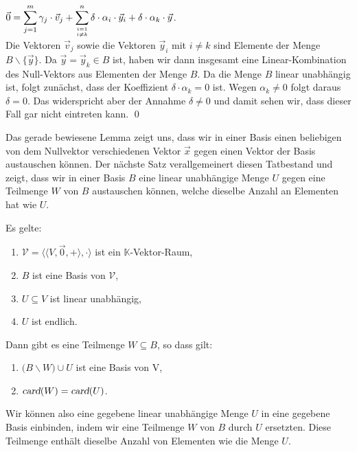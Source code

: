 \begin{enumerate}
\begin{enumerate}
            $\displaystyle\vec{0} = \sum\limits_{j=1}^m \gamma_j \cdot \vec{v}_j + \sum\limits_{i=1 \atop i \not= k}^n \delta\cdot \alpha_i \cdot \vec{y}_i + \delta\cdot \alpha_k \cdot \vec{y}$.
            \\[0.2cm]
            Die Vektoren $\vec{v}_j$ sowie die Vektoren $\vec{y}_i$ mit $i \not= k$ sind Elemente der Menge
            $B \backslash \{ \vec{y} \}$.  Da $\vec{y} = \vec{y}_k \in B$ ist,  haben wir dann insgesamt eine Linear-Kombination des Null-Vektors aus
            Elementen der Menge $B$.  Da die Menge $B$ linear unabh\"{a}ngig ist, folgt zun\"{a}chst, dass der Koeffizient
            $\delta\cdot \alpha_k = 0$  ist.  Wegen $\alpha_k \not= 0$ folgt daraus $\delta = 0$.  Das widerspricht aber der Annahme $\delta \not= 0$
            und damit sehen wir, dass dieser Fall gar nicht eintreten kann.
            \qed
      \end{enumerate}
\end{enumerate}

Das gerade bewiesene Lemma zeigt uns, dass wir in einer Basis einen beliebigen von dem Nullvektor
verschiedenen Vektor $\vec{x}$ 
gegen einen Vektor der Basis austauschen k\"{o}nnen.  Der n\"{a}chste Satz verallgemeinert diesen Tatbestand
und zeigt, dass wir 
in einer Basis $B$ eine linear unabh\"{a}ngige Menge $U$ gegen eine Teilmenge $W$ von $B$ austauschen
k\"{o}nnen, welche dieselbe Anzahl an Elementen hat wie $U$.

\begin{SatzStar}
  Es gelte:
  \begin{enumerate}
  \item $\mathcal{V} = \bigl\langle \langle V, \vec{0}, + \rangle, \cdot \bigr\rangle$ ist ein $\mathbb{K}$-Vektor-Raum,
  \item $B$ ist eine Basis von $\mathcal{V}$,
  \item $U \subseteq V$ ist linear unabh\"{a}ngig,
  \item $U$ ist endlich. 
  \end{enumerate}
  Dann gibt es eine Teilmenge $W \subseteq B$, so dass gilt:
  \begin{enumerate}
  \item $\bigl(B \backslash W\bigr) \cup U$ ist eine Basis von V,
  \item $\textsl{card}(W) = \textsl{card}(U)$.
  \end{enumerate}
  Wir k\"{o}nnen also eine gegebene linear unabh\"{a}ngige Menge $U$ in eine gegebene Basis einbinden,
  indem wir eine Teilmenge $W$ von $B$ durch $U$ ersetzten.  Diese Teilmenge enth\"{a}lt dieselbe
  Anzahl von Elementen wie die Menge $U$.
\end{SatzStar}

